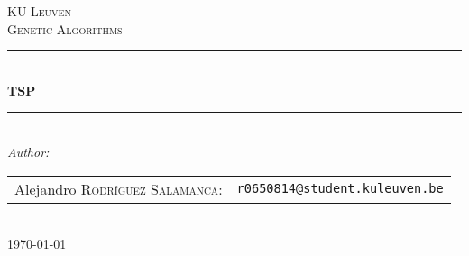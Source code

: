 \begin{titlepage}

\newcommand{\HRule}{\rule{\linewidth}{0.5mm}} %

\center %


\textsc{\LARGE KU Leuven}\\[3.5cm] %
\textsc{\Large Genetic Algorithms}\\[0.5cm] %


\HRule \\[0.4cm]
{ \huge \bfseries TSP}\\[0.4cm] %
\HRule \\[5.5cm]



\emph{Author:}\\[0.7cm]

\begin{tabular}{rl}
    Alejandro \textsc{Rodríguez Salamanca}: &\texttt{r0650814@student.kuleuven.be}\\
\end{tabular}\\[2cm]



{\large \today}\\[3cm] %




\vfill %

\end{titlepage}